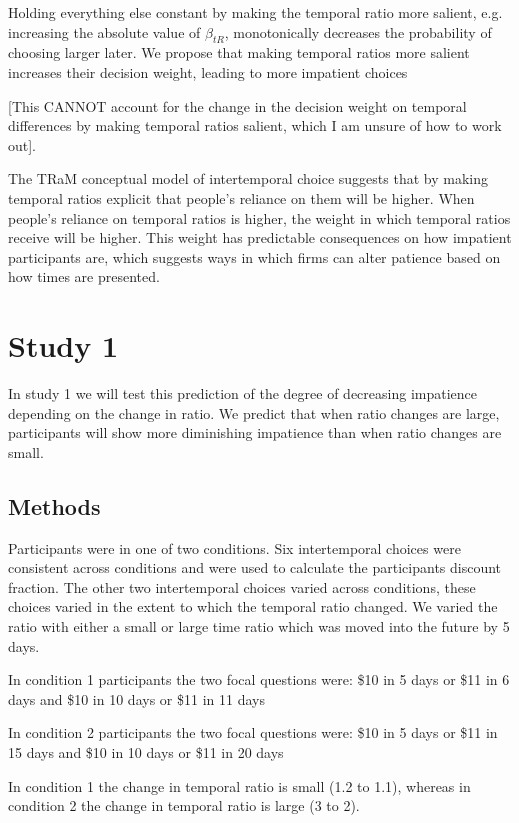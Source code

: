 \documentclass[]{article}
\begin{document}
Holding everything else constant by making the temporal ratio more salient, e.g. increasing the absolute value of $\beta_{tR}$,  monotonically decreases the probability of choosing larger later. We propose that making temporal ratios more salient increases their decision weight, leading to more impatient choices

{\large [This CANNOT account for the change in the decision weight on temporal differences by making temporal ratios salient, which I am unsure of how to work out]. 
}

The TRaM conceptual model of intertemporal choice suggests that by making temporal ratios explicit that people's reliance on them will be higher.
When people's reliance on temporal ratios is higher, the weight in which temporal ratios receive will be higher. 
This weight has predictable consequences on how impatient participants are, which suggests ways in which firms can alter patience based on how times are presented. 




\section{Study 1}

In study 1 we will test this prediction of the degree of decreasing impatience depending on the change in ratio.
We predict that when ratio changes are large, participants will show more diminishing impatience than when ratio changes are small. 

\subsection{Methods}
Participants were in one of two conditions. 
Six intertemporal choices were consistent across conditions and were used to calculate the participants discount fraction.
The other two intertemporal choices varied across conditions, these choices varied in the extent to which the temporal ratio changed.
We varied the ratio with either a small or large time ratio which was moved into the future by 5 days. 

In condition 1 participants the two focal questions were:  
\$10 in 5 days or \$11 in 6 days
and 
\$10 in 10 days or \$11 in 11 days

In condition 2 participants the two focal questions were: 
\$10 in 5 days or \$11 in 15 days
and 
\$10 in 10 days or \$11 in 20 days

In condition 1 the change in temporal ratio is small (1.2 to 1.1), whereas in condition 2 the change in temporal ratio is large (3 to 2). 
\end{document}

